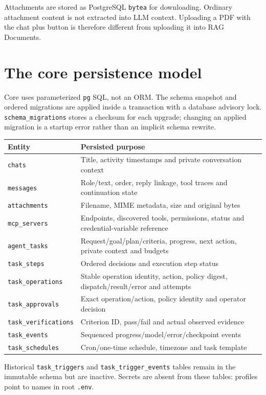 Attachments are stored as PostgreSQL \texttt{bytea} for downloading. Ordinary attachment content is not extracted into LLM context. Uploading a PDF with the chat plus button is therefore different from uploading it into RAG Documents.
\section*{The core persistence model}
Core uses parameterized \texttt{pg} SQL, not an ORM. The schema snapshot and ordered migrations are applied inside a transaction with a database advisory lock. \texttt{schema\_migrations} stores a checksum for each upgrade; changing an applied migration is a startup error rather than an implicit schema rewrite.
\begin{tabularx}{\linewidth}{@{}lX@{}}\toprule
Entity & Persisted purpose\\\midrule
\texttt{chats} & Title, activity timestamps and private conversation context\\
\texttt{messages} & Role/text, order, reply linkage, tool traces and continuation state\\
\texttt{attachments} & Filename, MIME metadata, size and original bytes\\
\texttt{mcp\_servers} & Endpoints, discovered tools, permissions, status and credential-variable reference\\
\texttt{agent\_tasks} & Request/goal/plan/criteria, progress, next action, private context and budgets\\
\texttt{task\_steps} & Ordered decisions and execution step status\\
\texttt{task\_operations} & Stable operation identity, action, policy digest, dispatch/result/error and attempts\\
\texttt{task\_approvals} & Exact operation/action, policy identity and operator decision\\
\texttt{task\_verifications} & Criterion ID, pass/fail and actual observed evidence\\
\texttt{task\_events} & Sequenced progress/model/error/checkpoint events\\
\texttt{task\_schedules} & Cron/one-time schedule, timezone and task template\\\bottomrule
\end{tabularx}
Historical \texttt{task\_triggers} and \texttt{task\_trigger\_events} tables remain in the immutable schema but are inactive. Secrets are absent from these tables: profiles point to names in root \texttt{.env}.
